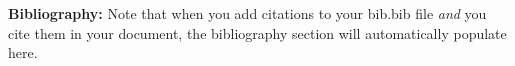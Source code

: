 \documentclass{article}\usepackage[]{graphicx}\usepackage[]{xcolor}
\begin{document}
\begin{multicols}{2}
\vspace{2em}

\noindent\textbf{Bibliography:} Note that when you add citations to your bib.bib file \emph{and}
you cite them in your document, the bibliography section will automatically populate here.

\begin{tiny}

\end{tiny}
\end{multicols}
\end{document}
